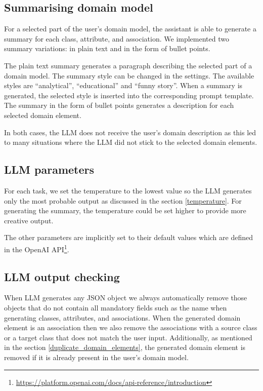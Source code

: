 \subsection{Summarising domain model}
\label{summarising_domain_model}

For a selected part of the user's domain model, the assistant is able to generate a summary for each class, attribute, and association. We implemented two summary variations: in plain text and in the form of bullet points.

The plain text summary generates a paragraph describing the selected part of a domain model. The summary style can be changed in the settings. The available styles are ``analytical'', ``educational'' and ``funny story''. When a summary is generated, the selected style is inserted into the corresponding prompt template. The summary in the form of bullet points generates a description for each selected domain element.

In both cases, the LLM does not receive the user's domain description as this led to many situations where the LLM did not stick to the selected domain elements.


\subsection{LLM parameters}

For each task, we set the temperature to the lowest value so the LLM generates only the most probable output as discussed in the section \ref{temperature}. For generating the summary, the temperature could be set higher to provide more creative output.

The other parameters are implicitly set to their default values which are defined in the OpenAI API\footnote{\url{https://platform.openai.com/docs/api-reference/introduction}}.


\subsection{LLM output checking}

When LLM generates any JSON object we always automatically remove those objects that do not contain all mandatory fields such as the name when generating classes, attributes, and associations. When the generated domain element is an association then we also remove the associations with a source class or a target class that does not match the user input. Additionally, as mentioned in the section \ref{duplicate_domain_elements}, the generated domain element is removed if it is already present in the user's domain model.


